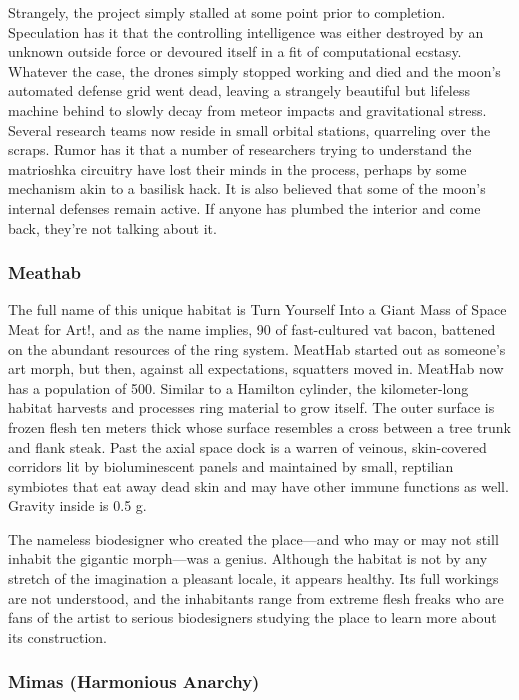 Strangely, the project simply stalled at some point 
prior to completion. Speculation has it that the 
controlling intelligence was either destroyed by an 
unknown outside force or devoured itself in a fit of 
computational ecstasy. Whatever the case, the drones 
simply stopped working and died and the moon's automated defense grid went dead, leaving a strangely 
beautiful but lifeless machine behind to slowly decay 
from meteor impacts and gravitational stress. Several 
research teams now reside in small orbital stations, 
quarreling over the scraps. Rumor has it that a 
number of researchers trying to understand the matrioshka circuitry have lost their minds in the process, 
perhaps by some mechanism akin to a basilisk hack. 
It is also believed that some of the moon's internal 
defenses remain active. If anyone has plumbed the 
interior and come back, they're not talking about it.

\subsubsection{Meathab}

The full name of this unique habitat is Turn Yourself 
Into a Giant Mass of Space Meat for Art!, and as the 
name implies, 90%
of fast-cultured vat bacon, battened on the abundant resources of the ring system. MeatHab started 
out as someone's art morph, but then, against all 
expectations, squatters moved in. MeatHab now has 
a population of 500. Similar to a Hamilton cylinder, 
the kilometer-long habitat harvests and processes ring 
material to grow itself. The outer surface is frozen 
flesh ten meters thick whose surface resembles a cross 
between a tree trunk and flank steak. Past the axial 
space dock is a warren of veinous, skin-covered corridors lit by bioluminescent panels and maintained by 
small, reptilian symbiotes that eat away dead skin and 
may have other immune functions as well. Gravity 
inside is 0.5 g.

The nameless biodesigner who created the 
place—and who may or may not still inhabit the 
gigantic morph—was a genius. Although the habitat 
is not by any stretch of the imagination a pleasant locale, it appears healthy. Its full workings are 
not understood, and the inhabitants range from 
extreme flesh freaks who are fans of the artist to serious biodesigners studying the place to learn more 
about its construction.

\subsubsection{Mimas (Harmonious Anarchy)}

